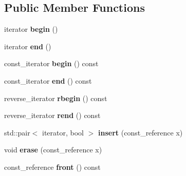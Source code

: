 \subsection*{Public Member Functions}
\begin{DoxyCompactItemize}
\item 
iterator {\bfseries begin} ()\hypertarget{classpriority__list_a1a1fd842c06b25d19fd350a873e88428}{}\label{classpriority__list_a1a1fd842c06b25d19fd350a873e88428}

\item 
iterator {\bfseries end} ()\hypertarget{classpriority__list_a99affa51d211797a8e4b1b48f45e4ea1}{}\label{classpriority__list_a99affa51d211797a8e4b1b48f45e4ea1}

\item 
const\+\_\+iterator {\bfseries begin} () const \hypertarget{classpriority__list_a09249702bf11d74a5efedb636cf67b15}{}\label{classpriority__list_a09249702bf11d74a5efedb636cf67b15}

\item 
const\+\_\+iterator {\bfseries end} () const \hypertarget{classpriority__list_ad0517dbabf2deee8497a4528bfc75011}{}\label{classpriority__list_ad0517dbabf2deee8497a4528bfc75011}

\item 
reverse\+\_\+iterator {\bfseries rbegin} () const \hypertarget{classpriority__list_a5499f128a0de613d408bcdd6ecb25e59}{}\label{classpriority__list_a5499f128a0de613d408bcdd6ecb25e59}

\item 
reverse\+\_\+iterator {\bfseries rend} () const \hypertarget{classpriority__list_a85c04ba2b1a56cef08519841f9e2ccef}{}\label{classpriority__list_a85c04ba2b1a56cef08519841f9e2ccef}

\item 
std\+::pair$<$ iterator, bool $>$ {\bfseries insert} (const\+\_\+reference x)\hypertarget{classpriority__list_a8c6a795e3726e752a9f5f496c992708c}{}\label{classpriority__list_a8c6a795e3726e752a9f5f496c992708c}

\item 
void {\bfseries erase} (const\+\_\+reference x)\hypertarget{classpriority__list_a1866b33a30dc3035a074f94c982b1ada}{}\label{classpriority__list_a1866b33a30dc3035a074f94c982b1ada}

\item 
const\+\_\+reference {\bfseries front} () const \hypertarget{classpriority__list_a06b3700f61026d4ca260b92a42d5e35b}{}\label{classpriority__list_a06b3700f61026d4ca260b92a42d5e35b}


\end{DoxyCompactItemize}
